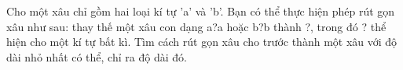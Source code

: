 Cho một xâu chỉ gồm hai loại kí tự 'a' và 'b'. Bạn có thể thực hiện phép rút gọn xâu như sau: thay thế một xâu con dạng a?a hoặc b?b thành ?, trong đó ? thể hiện cho một kí tự bất kì.
Tìm cách rút gọn xâu cho trước thành một xâu với độ dài nhỏ nhất có thể, chỉ ra độ dài đó.